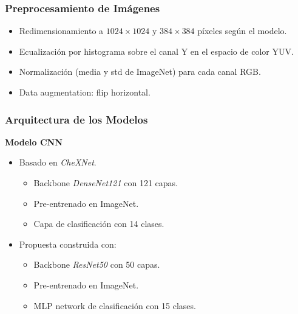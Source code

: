 \begin{frame}
\frametitle{Preprocesamiento de Imágenes}
\begin{itemize}
    \item Redimensionamiento a $1024 \times 1024$ y $384 \times 384$ píxeles según el modelo.
    \item Ecualización por histograma sobre el canal Y en el espacio de color YUV.
    \item Normalización (media y std de ImageNet) para cada canal RGB.
    \item Data augmentation: flip horizontal.
\end{itemize}
\end{frame}

\begin{frame}
\frametitle{Arquitectura de los Modelos}
    \textbf{Modelo CNN}
    \begin{itemize}
        \item Basado en \textit{CheXNet}.
        \begin{itemize}
            \item Backbone \textit{DenseNet121} con 121 capas.
            \item Pre-entrenado en ImageNet.
            \item Capa de clasificación con 14 clases.
        \end{itemize}
        \item Propuesta construida con:
        \begin{itemize}
            \item Backbone \textit{ResNet50} con 50 capas.
            \item Pre-entrenado en ImageNet.
            \item MLP network de clasificación con 15 clases.
        \end{itemize}
    \end{itemize}
\end{frame}

